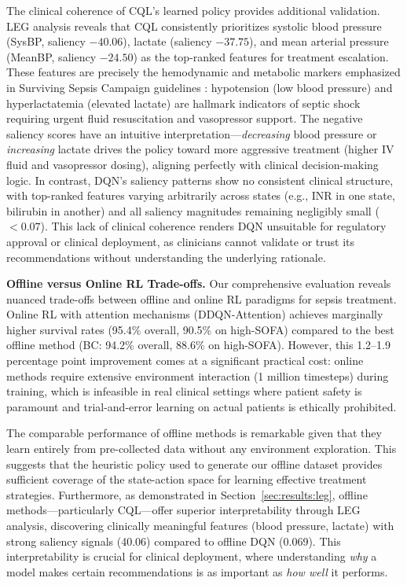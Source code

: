 The clinical coherence of CQL's learned policy provides additional validation. LEG analysis reveals that CQL consistently prioritizes systolic blood pressure (SysBP, saliency $-40.06$), lactate (saliency $-37.75$), and mean arterial pressure (MeanBP, saliency $-24.50$) as the top-ranked features for treatment escalation. These features are precisely the hemodynamic and metabolic markers emphasized in Surviving Sepsis Campaign guidelines \citep{rhodes2017ssc}: hypotension (low blood pressure) and hyperlactatemia (elevated lactate) are hallmark indicators of septic shock requiring urgent fluid resuscitation and vasopressor support. The negative saliency scores have an intuitive interpretation—\textit{decreasing} blood pressure or \textit{increasing} lactate drives the policy toward more aggressive treatment (higher IV fluid and vasopressor dosing), aligning perfectly with clinical decision-making logic. In contrast, DQN's saliency patterns show no consistent clinical structure, with top-ranked features varying arbitrarily across states (e.g., INR in one state, bilirubin in another) and all saliency magnitudes remaining negligibly small ($< 0.07$). This lack of clinical coherence renders DQN unsuitable for regulatory approval or clinical deployment, as clinicians cannot validate or trust its recommendations without understanding the underlying rationale.

\textbf{Offline versus Online RL Trade-offs.} Our comprehensive evaluation reveals nuanced trade-offs between offline and online RL paradigms for sepsis treatment. Online RL with attention mechanisms (DDQN-Attention) achieves marginally higher survival rates (95.4\% overall, 90.5\% on high-SOFA) compared to the best offline method (BC: 94.2\% overall, 88.6\% on high-SOFA). However, this 1.2--1.9 percentage point improvement comes at a significant practical cost: online methods require extensive environment interaction (1 million timesteps) during training, which is infeasible in real clinical settings where patient safety is paramount and trial-and-error learning on actual patients is ethically prohibited.

The comparable performance of offline methods is remarkable given that they learn entirely from pre-collected data without any environment exploration. This suggests that the heuristic policy used to generate our offline dataset provides sufficient coverage of the state-action space for learning effective treatment strategies. Furthermore, as demonstrated in Section~\ref{sec:results:leg}, offline methods—particularly CQL—offer superior interpretability through LEG analysis, discovering clinically meaningful features (blood pressure, lactate) with strong saliency signals (40.06) compared to offline DQN (0.069). This interpretability is crucial for clinical deployment, where understanding \textit{why} a model makes certain recommendations is as important as \textit{how well} it performs.

